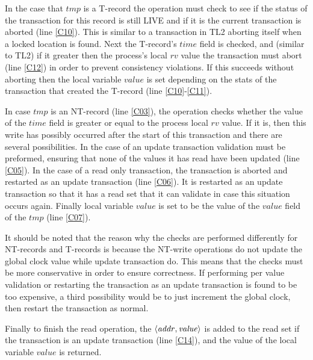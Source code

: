 In the case that $\mathit{tmp}$ is a T-record the operation must check to see
if the status of the transaction for this record is still LIVE and if it is
the current transaction is aborted (line \ref{C10}).
This is similar to a transaction in TL2 aborting itself when a locked location is found.
Next the T-record's $\mathit{time}$ field is checked, and (similar to TL2) if it 
greater then the process's local $\mathit{rv}$ value the transaction must abort 
(line \ref{C12}) in order to prevent consistency violations.
If this succeeds without aborting then the local variable $\mathit{value}$
is set depending on the stats of the transaction that created the T-record (line \ref{C10}-\ref{C11}).

In case $\mathit{tmp}$ is an 
NT-record (line \ref{C03}), the operation
checks whether the value of the $\mathit{time}$ field is
greater or equal to the process local $\mathit{rv}$ value.
If it is, then this write has possibly occurred after the start of this
transaction and there are several possibilities.
In the case of an update transaction validation must be preformed, ensuring
that none of the values it has read have been updated (line \ref{C05}).
In the case of a read only transaction, the transaction
is aborted and restarted as an update transaction (line \ref{C06}).
It is restarted as an update transaction so that it has a read set that it can validate
in case this situation occurs again.
Finally local variable $\mathit{value}$ is set to be the value
of the $\mathit{value}$ field of the $\mathit{tmp}$ (line \ref{C07}).

It should be noted that the reason why the checks are performed differently
for NT-records and T-records is because the NT-write operations do not
update the global clock value while update transaction do.
This means that the checks must be more conservative in order to ensure correctness.
If performing per value validation or restarting the transaction as an update transaction
is found to be too expensive, a third possibility would be to just increment the global
clock, then restart the transaction as normal.

Finally to finish the read operation, the $\left \langle \mathit{addr, value} \right \rangle $
is added to the read set if the transaction is an update transaction (line \ref{C14}),
and the value of the local variable $\mathit{value}$  is returned.

